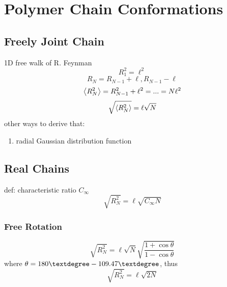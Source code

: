 \documentclass[a4paper]{article}
\begin{document}
\section{Polymer Chain Conformations}
\subsection{Freely Joint Chain}
1D free walk of R. Feynman\\
\begin{equation}\label{key}
R_1^2 = \ell^2
\end{equation}
\begin{equation}\label{key}
R_N = R_{N-1}+\ell, R_{N-1}-\ell
\end{equation}
\begin{equation}\label{key}
\ev{R_N^2} = R_{N-1}^2 + \ell^2 = ... = N\ell^2 
\end{equation}
\begin{equation}\label{key}
\sqrt{\ev{R_N^2}} = \ell\sqrt{N}
\end{equation}
other ways to derive that:
\begin{enumerate}
	\item radial Gaussian distribution function
\end{enumerate}
\subsection{Real Chains}
def: characteristic ratio $ C_\infty $
\begin{equation}\label{key}
\sqrt{R_N^2} = \ell\sqrt{C_\infty N}
\end{equation}
\subsubsection{Free Rotation}
\begin{equation}\label{key}
\sqrt{R_N^2} = \ell\sqrt{N} \sqrt{\dfrac{1+\cos\theta}{1-\cos\theta}}
\end{equation}
where $ \theta = 180\textdegree - 109.47\textdegree $, thus
\begin{equation}\label{key}
\sqrt{R_N^2} = \ell\sqrt{2 N}
\end{equation}
\end{document}
